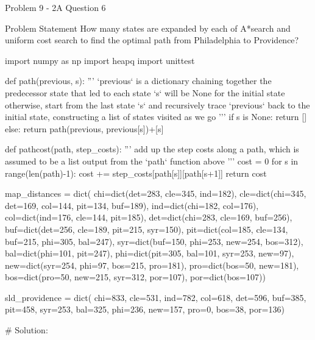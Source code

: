 \begin{problem}{Problem 9 - 2A Question 6}
    \begin{statement}{Problem Statement}
        How many states are expanded by each of A*search and uniform cost search to find the optimal path from Philadelphia to Providence?
    \end{statement}

    \begin{highlight}[Solution]
    \begin{code}[Python]
    import numpy as np
    import heapq
    import unittest
    
    def path(previous, s): 
        '''
        `previous` is a dictionary chaining together the predecessor state that led to each state
        `s` will be None for the initial state
        otherwise, start from the last state `s` and recursively trace `previous` back to the initial state,
        constructing a list of states visited as we go
        '''
        if s is None:
            return []
        else:
            return path(previous, previous[s])+[s]
    
    def pathcost(path, step_costs):
        '''
        add up the step costs along a path, which is assumed to be a list output from the `path` function above
        '''
        cost = 0
        for s in range(len(path)-1):
            cost += step_costs[path[s]][path[s+1]]
        return cost
    
    map_distances = dict(
        chi=dict(det=283, cle=345, ind=182),
        cle=dict(chi=345, det=169, col=144, pit=134, buf=189),
        ind=dict(chi=182, col=176),
        col=dict(ind=176, cle=144, pit=185),
        det=dict(chi=283, cle=169, buf=256),
        buf=dict(det=256, cle=189, pit=215, syr=150),
        pit=dict(col=185, cle=134, buf=215, phi=305, bal=247),
        syr=dict(buf=150, phi=253, new=254, bos=312),
        bal=dict(phi=101, pit=247),
        phi=dict(pit=305, bal=101, syr=253, new=97),
        new=dict(syr=254, phi=97, bos=215, pro=181),
        pro=dict(bos=50, new=181),
        bos=dict(pro=50, new=215, syr=312, por=107),
        por=dict(bos=107))
    
    sld_providence = dict(
        chi=833,
        cle=531,
        ind=782,
        col=618,
        det=596,
        buf=385,
        pit=458,
        syr=253,
        bal=325,
        phi=236,
        new=157,
        pro=0,
        bos=38,
        por=136)
    
    # Solution:
    

\end{code}
\end{highlight}
\end{problem}
